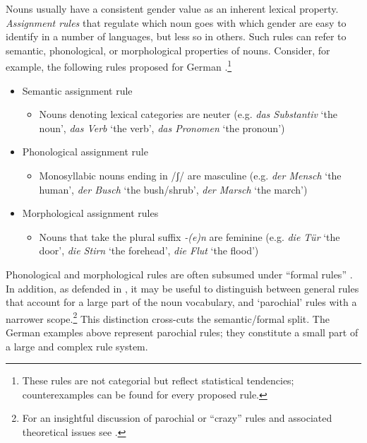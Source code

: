 \documentclass[output=collectionpaper]{langsci/langscibook}
\begin{document}
Nouns usually have a consistent gender value as an inherent lexical property. \textit{Assignment rules} that regulate which noun goes with which gender are easy to identify in a number of languages, but less so in others. Such rules can refer to semantic, phonological, or morphological properties of nouns. Consider, for example, the following rules proposed for German \citep[chapter 3]{Koepcke1982}.\footnote{These rules are not categorial but reflect statistical tendencies; counterexamples can be found for every proposed rule.}

\begin{itemize}
\item Semantic assignment rule

\begin{itemize}
\item Nouns denoting lexical categories are neuter (e.g. \textit{das Substantiv} `the noun', \textit{das Verb} `the verb', \textit{das Pronomen} `the pronoun')
\end{itemize}

\item Phonological assignment rule

\begin{itemize}
\item Monosyllabic nouns ending in /ʃ/ are masculine (e.g. \textit{der Mensch} `the human', \textit{der Busch} `the bush/shrub', \textit{der Marsch} `the march')
\end{itemize}

\item Morphological assignment rules

\begin{itemize}
\item Nouns that take the plural suffix \textit{{}-(e)n} are feminine (e.g. \textit{die Tür} `the door', \textit{die Stirn} `the forehead', \textit{die Flut} `the flood')
\end{itemize}
\end{itemize}

Phonological and morphological rules are often subsumed under ``formal rules'' \citep{Corbett2013b}. In addition, as defended in \citet{Audring2017}, it may be useful to distinguish between general rules that account for a large part of the noun vocabulary, and `parochial' rules with a narrower scope.\footnote{For an insightful discussion of parochial or ``crazy'' rules and associated theoretical issues see \citet{Enger2009}.} This distinction cross-cuts the semantic/formal split. The German examples above represent parochial rules; they constitute a small part of a large and complex rule system.
\end{document}
